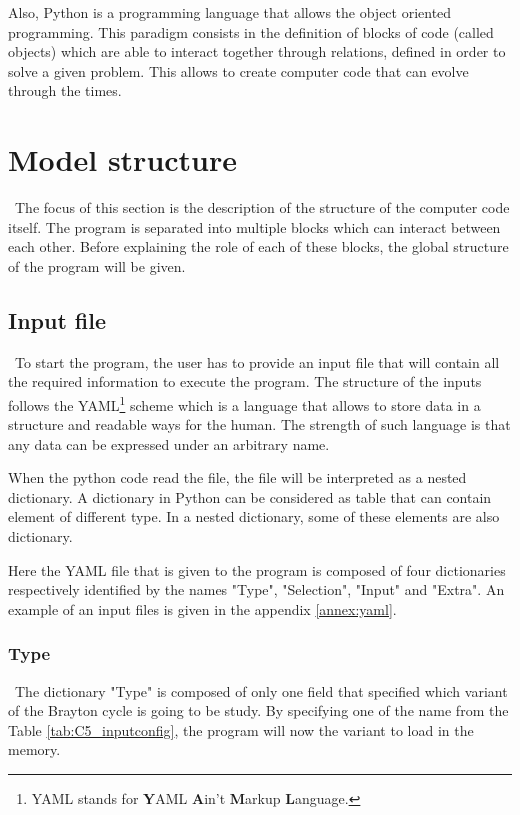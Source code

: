 Also, Python is a programming language that allows the object oriented programming. This paradigm consists in the definition of blocks of code (called objects) which are able to interact together through relations, defined in order to solve a given problem. This allows to create computer code that can evolve through the times. 

\section{Model structure}
\quad\, The focus of this section is the description of the structure of the computer code itself. The program is separated into multiple blocks which can interact between each other. Before explaining the role of each of these blocks, the global structure of the program will be given.

\subsection{Input file}
\quad\, To start the program, the user has to provide an input file that will contain all the required information to execute the program. The structure of the inputs follows the YAML\footnote{YAML stands for \textbf{Y}AML \textbf{A}in't \textbf{M}arkup \textbf{L}anguage.} scheme which is a language that allows to store data in a structure and readable ways for the human. The strength of such language is that any data can be expressed under an arbitrary name. 

When the python code read the file, the file will be interpreted as a nested dictionary. A dictionary in Python can be considered as table that can contain element of different type. In a nested dictionary, some of these elements are also dictionary.

Here the YAML file that is given to the program is composed of four dictionaries respectively identified by the names "Type", "Selection", "Input" and "Extra". An example of an input files is given in the appendix \ref{annex:yaml}. 

\subsubsection{Type}
\quad\ The dictionary "Type" is composed of only one field that specified which variant of the Brayton cycle is going to be study. By specifying one of the name from the Table \ref{tab:C5_inputconfig}, the program will now the variant to load in the memory.

